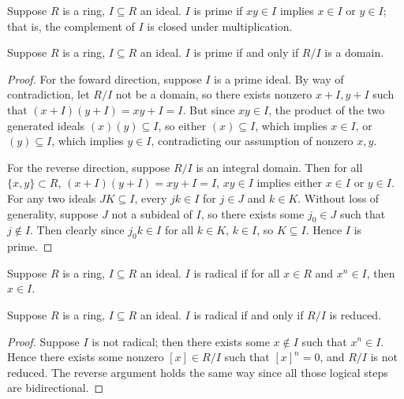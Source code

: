 \begin{definition}
    Suppose \(R\) is a ring, \(I \subseteq R\) an ideal.
    \(I\) is prime if \(xy \in I\) implies \(x \in I\) or \(y \in I\);
    that is, the complement of \(I\) is closed under multiplication.
\end{definition}
\begin{theorem}\label{thm:prime-quotient-domain}
    Suppose \(R\) is a ring, \(I \subseteq R\) an ideal.
    \(I\) is prime if and only if \(R/I\) is a domain.
\end{theorem}
\begin{proof}
    For the foward direction, suppose \(I\) is a prime ideal.
    By way of contradiction, let \(R/I\) not be a domain,
    so there exists nonzero \(x+I, y+I\) such that \((x+I)(y+I) = xy+I = I\).
    But since \(xy \in I\),
    the product of the two generated ideals \((x)(y) \subseteq I\),
    so either \((x) \subseteq I\), which implies \(x \in I\),
    or \((y) \subseteq I\), which implies \(y \in I\),
    contradicting our assumption of nonzero \(x,y\).

    For the reverse direction, suppose \(R/I\) is an integral domain.
    Then for all \(\{x,y\} \subset R\), \((x+I)(y+I) = xy+I = I\),
    \(xy \in I\) implies either \(x \in I\) or \(y \in I\).
    For any two ideals \(JK \subseteq I\),
    every \(jk \in I\) for \(j \in J\) and \(k \in K\).
    Without loss of generality, suppose \(J\) not a subideal of \(I\),
    so there exists some \(j_0 \in J\) such that \(j \notin I\).
    Then clearly since \(j_0 k \in I\) for all \(k \in K\),
    \(k \in I\), so \(K \subseteq I\).
    Hence \(I\) is prime.
\end{proof}

\begin{definition}
    Suppose \(R\) is a ring, \(I \subseteq R\) an ideal.
    \(I\) is radical if for all \(x \in R\) and \(x^n \in I\), then \(x \in I\).
\end{definition}
\begin{theorem}\label{thm:radical-quotient-reduced}
    Suppose \(R\) is a ring, \(I \subseteq R\) an ideal.
    \(I\) is radical if and only if \(R/I\) is reduced.
\end{theorem}
\begin{proof}
    Suppose \(I\) is not radical;
    then there exists some \(x \notin I\) such that \(x^n \in I\).
    Hence there exists some nonzero \([x] \in R/I\) such that \({[x]}^n = 0\),
    and \(R/I\) is not reduced.
    The reverse argument holds the same way since all those logical steps are bidirectional.
\end{proof}


